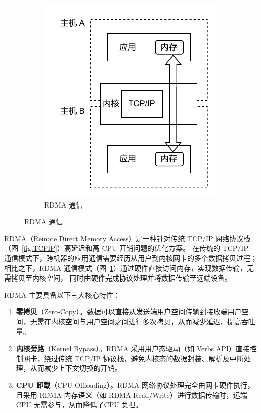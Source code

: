 {\begin{figure}[!htbp]
        \begin{subfigure}[b]{0.40\textwidth}
            \includegraphics[width=\textwidth]{Img/RDMA通信.drawio.pdf}
            \caption{RDMA 通信}
            \label{fig:RDMA}
        \end{subfigure}
        \label{fig:DMA-RDMA}
    \end{figure}

    RDMA（Remote Direct Memory Access）是一种针对传统 TCP/IP 网络协议栈（图~\ref{fig:TCPIP}）高延迟和高 CPU 开销问题的优化方案。
    在传统的 TCP/IP 通信模式下，跨机器的应用通信需要经历从用户到内核网卡的多个数据拷贝过程；
    相比之下，RDMA 通信模式（图~\ref{fig:RDMA}）通过硬件直接访问内存，实现数据传输，无需拷贝至内核空间，
    同时由硬件完成协议处理并将数据传输至远端设备。

    RDMA 主要具备以下三大核心特性：
    \begin{enumerate}[label=\arabic*.]
        \item \textbf{零拷贝}（Zero-Copy）。数据可以直接从发送端用户空间传输到接收端用户空间，无需在内核空间与用户空间之间进行多次拷贝，从而减少延迟，提高吞吐量。
        \item \textbf{内核旁路}（Kernel Bypass）。RDMA 采用用户态驱动（如 Verbs API）直接控制网卡，绕过传统 TCP/IP 协议栈，避免内核态的数据封装、解析及中断处理，从而减少上下文切换的开销。
        \item \textbf{CPU 卸载}（CPU Offloading）。RDMA 网络协议处理完全由网卡硬件执行，
              且采用 RDMA 内存语义（如 RDMA Read/Write）进行数据传输时，远端 CPU 无需参与，从而降低了CPU 负担。
    \end{enumerate}

}
